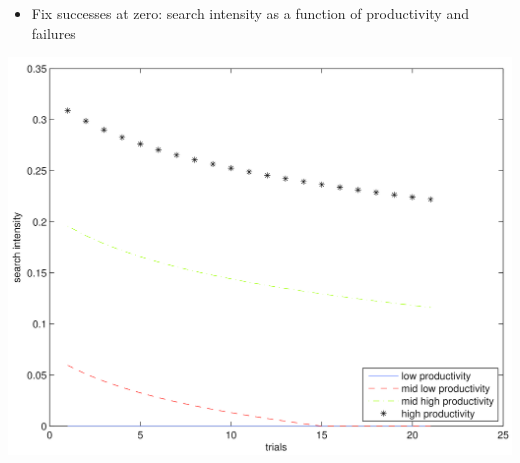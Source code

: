 \documentclass[notes=show]{beamer}
\begin{document}
\begin{frame}%


\begin{itemize}
\item Fix successes at zero: search intensity as a function of productivity and failures
\end{itemize}

\includegraphics[scale=0.07]{figs/baseline_policy_no_suc_2d.png}

\end{frame}%
\end{document}
